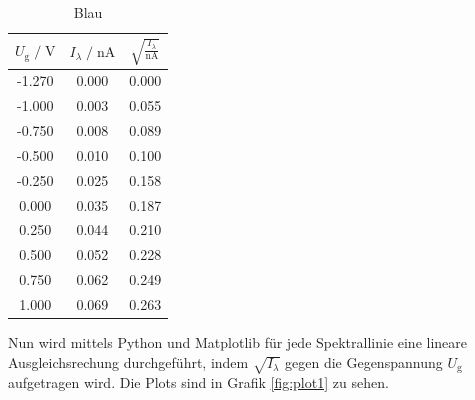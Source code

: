 \begin{table}
    \centering
    \caption{Blau}
    \label{tab:blau}
    \begin{tabular}{c c c}
    \toprule
    $ U_\text{g} \;/\; \si{\volt} $ & $I_\lambda \;/\; \si{\nano\ampere}$ &
    $ \sqrt{\frac{I_\lambda}{\si{\nano\ampere}}}$\\
    \midrule 
      -1.270 & 0.000 & 0.000\\
      -1.000 & 0.003 & 0.055\\
      -0.750 & 0.008 & 0.089\\
      -0.500 & 0.010 & 0.100\\
      -0.250 & 0.025 & 0.158\\
       0.000 & 0.035 & 0.187\\
       0.250 & 0.044 & 0.210\\
       0.500 & 0.052 & 0.228\\
       0.750 & 0.062 & 0.249\\
       1.000 & 0.069 & 0.263\\ 
    \bottomrule
    \end{tabular}
\end{table}


Nun wird mittels Python und Matplotlib für jede Spektrallinie eine lineare Ausgleichsrechung durchgeführt, indem 
$\sqrt{I_\lambda}$ gegen die Gegenspannung $U_\text{g}$ aufgetragen wird. Die Plots sind in Grafik \ref{fig:plot1} zu sehen.

